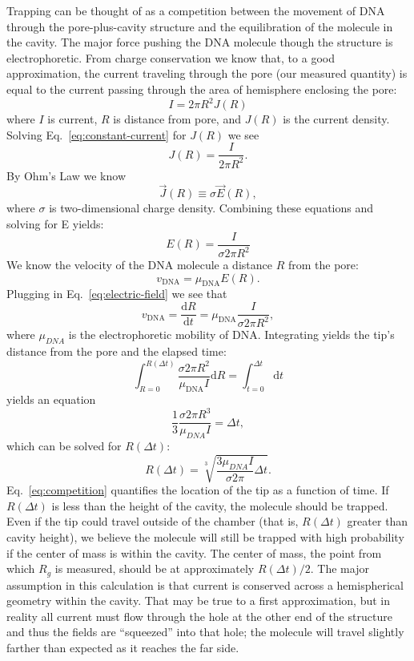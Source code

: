 \documentclass[aps,prl,preprint,groupedaddress]{revtex4}
\begin{document}
Trapping can be thought of as a competition between the movement of DNA through the pore-plus-cavity structure and the equilibration of the molecule in the cavity. The major force pushing the DNA molecule though the structure is electrophoretic. From charge conservation we know that, to a good approximation, the current traveling through the pore (our measured quantity) is equal to the current passing through the area of hemisphere enclosing the pore: 
\begin{equation} I = 2 \pi R^2 J(R) \label{eq:constant-current}\end{equation} 
where \(I\) is current, \(R\) is distance from pore, and \(J(R)\) is the current density. Solving Eq.~\ref{eq:constant-current} for \(J(R)\) we see 
\[J(R) = \frac{I}{2 \pi R^2}.\] 
By Ohm's Law we know 
\[\overrightarrow{J}(R) \equiv \sigma \overrightarrow{E}(R),\]
where \(\sigma\) is two-dimensional charge density.
Combining these equations and solving for E yields:
\begin{equation} E(R) = \frac{I}{\sigma 2 \pi R^2} \label{eq:electric-field} \end{equation} 
We know the velocity of the DNA molecule a distance \(R\) from the pore: 
\begin{equation} v_{\mathrm{DNA}} = \mu_{\mathrm{DNA}} E(R) \label{eq:velocity} .\end{equation} 
Plugging in Eq.~\ref{eq:electric-field} we see that
\[v_{\mathrm{DNA}} = \frac{\mathrm{d}R}{\mathrm{d}t} = \mu_{\mathrm{DNA}} \frac{I}{\sigma 2 \pi R^2},\]
where \(\mu_{DNA}\) is the electrophoretic mobility of DNA.
Integrating yields the tip's distance from the pore and the elapsed time:
\[\int_{R=0}^{R(\Delta t)} \frac{\sigma 2 \pi R^2}{\mu_{\mathrm{DNA}} I} \mathrm{d}R = \int_{t=0}^{\Delta t} \mathrm{d}t \]
yields an equation
\[\frac{1}{3} \frac{\sigma 2 \pi R^3}{\mu_{DNA} I} = \Delta t,\]
which can be solved for \(R(\Delta t)\):
\begin{equation} R(\Delta t) = \sqrt[3]{\frac{3 \mu_{DNA} I}{\sigma 2 \pi}\Delta t} .\label{eq:competition}\end{equation}
Eq.~\ref{eq:competition} quantifies the location of the tip as a function of time. If \(R(\Delta t)\) is less than the height of the cavity, the molecule should be trapped. Even if the tip could travel outside of the chamber (that is, \(R(\Delta t)\) greater than cavity height), we believe the molecule will still be trapped with high probability if the center of mass is within the cavity. The center of mass, the point from which \(R_g\) is measured, should be at approximately \(R(\Delta t)/2\). The major assumption in this calculation is that current is conserved across a hemispherical geometry within the cavity. That may be true to a first approximation, but in reality all current must flow through the hole at the other end of the structure and thus the fields are ``squeezed'' into that hole; the molecule will travel slightly farther than expected as it reaches the far side.
\end{document}
